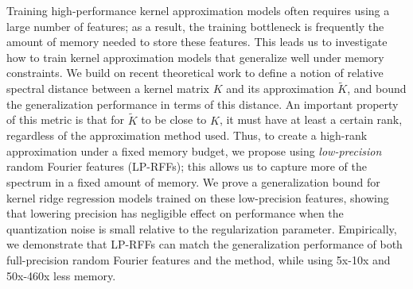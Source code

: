 
Training high-performance kernel approximation models often requires using a large number of features; as a result, the training bottleneck is frequently the amount of memory needed to store these features. This leads us to investigate how to train kernel approximation models that generalize well under memory constraints. We build on recent theoretical work to define a notion of relative spectral distance between a kernel matrix $K$ and its approximation $\tilde{K}$, and bound the generalization performance in terms of this distance. An important property of this metric is that for $\tilde{K}$ to be close to $K$, it must have at least a certain rank, regardless of the approximation method used. Thus, to create a high-rank approximation under a fixed memory budget, we propose using \emph{low-precision} random Fourier features (LP-RFFs); this allows us to capture more of the spectrum in a fixed amount of memory. We prove a generalization bound for kernel ridge regression models trained on these low-precision features, showing that lowering precision has negligible effect on performance when the quantization noise is small relative to the regularization parameter. Empirically, we demonstrate that LP-RFFs can match the generalization performance of both full-precision random Fourier features and the \Nystrom method, while using 5x-10x and 50x-460x less memory.


